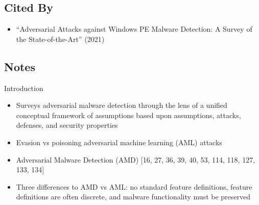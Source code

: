 \documentclass{article}
\begin{document}
\subsection*{Cited By}
\begin{itemize}
\item ``Adversarial Attacks against Windows PE Malware Detection: A Survey of the State-of-the-Art'' (2021)
\end{itemize}

\subsection*{Notes}

\noindent Introduction
\begin{itemize}
\item Surveys adversarial malware detection through the lens of a unified conceptual framework of assumptions based upon assumptions, attacks, defenses, and security properties
\item Evasion vs poisoning adversarial machine learning (AML) attacks
\item Adversarial Malware Detection (AMD) [16, 27, 36, 39, 40, 53, 114, 118, 127, 133, 134]
\item Three differences to AMD vs AML: no standard feature definitions, feature definitions are often discrete, and malware functionality must be preserved
\end{itemize}
\end{document}
